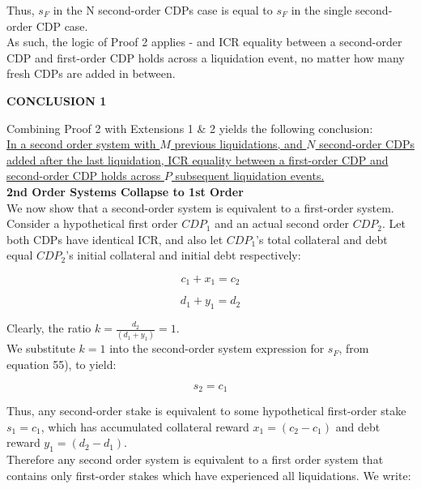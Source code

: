 \documentclass[reqno]{article}
\begin{document}
Thus, $s_F$ in the N second-order CDPs case is equal to $s_F$ in the single second-order CDP case.\\

As such, the logic of Proof 2 applies - and ICR equality between a second-order CDP and first-order CDP holds across a liquidation event, no matter how many fresh CDPs are added in between.

\newpage
\bigskip
\textbf{CONCLUSION 1}

\bigskip
Combining Proof 2 with Extensions 1 \& 2 yields the following conclusion:\\

\uline{In a second order system with $M$ previous liquidations, and $N$ second-order CDPs added after the last liquidation, ICR equality between a first-order CDP and second-order CDP holds across $P$ subsequent liquidation events.}\\

\textbf{2nd Order Systems Collapse to 1st Order}\\
We now show that a second-order system is equivalent to a first-order system.\\

Consider a hypothetical first order $CDP_1$ and an actual second order $CDP_2$. Let both CDPs have identical ICR, and also let $CDP_1$’s total collateral and debt equal $CDP_2$’s initial collateral and initial debt respectively:

\begin{equation} 
    c_1+x_1=c_2
\end{equation}

\begin{equation} 
    d_1+y_1=d_2
\end{equation}

\bigskip
Clearly, the ratio  $k = \frac{d_2}{(d_1+y_1)} = 1$.\\

We substitute $k=1$ into the second-order system expression for $s_F$, from equation 55), to yield:

\begin{equation} 
    s_2=c_1
\end{equation}

\bigskip
Thus, any second-order stake is equivalent to some hypothetical first-order stake $s_1=c_1$, which has accumulated collateral reward $x_1=(c_2-c_1)$ and debt reward $y_1=(d_2-d_1)$.\\

Therefore any second order system is equivalent to a first order system that contains only first-order stakes which have experienced all liquidations. We write:
\end{document}

